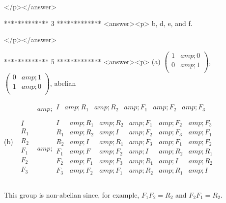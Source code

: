 </p></answer>


*************
3
*************
<answer><p>  b, d, e, and f.

</p></answer>


*************
5
*************
<answer><p> (a)  \(\left(
\begin{array}{cc}
 1 &amp; 0 \\
 0 &amp; 1 \\
\end{array}
\right)\), \(\left(
\begin{array}{cc}
 0 &amp; 1 \\
 1 &amp; 0 \\
\end{array}
\right)\),  abelian



    (b)     \(\begin{array}{c|c}
   &amp; 
\begin{array}{cccccc}
 I &amp; R_1 &amp; R_2 &amp; F_1 &amp; F_2 &amp; F_3 \\
\end{array}
 \\
\hline
 
\begin{array}{c}
 I \\
 R_1 \\
 R_2 \\
 F_1 \\
 F_2 \\
 F_3 \\
\end{array}
 &amp; 
\begin{array}{cccccc}
 I &amp; R_1 &amp; R_2 &amp; F_1 &amp; F_2 &amp; F_3 \\
 R_1 &amp; R_2 &amp; I &amp; F_2 &amp; F_3 &amp; F_1 \\
 R_2 &amp; I &amp; R_1 &amp; F_3 &amp; F_1 &amp; F_2 \\
 F_1 &amp; F &amp; F_2 &amp; I &amp; R_2 &amp; R_1 \\
 F_2 &amp; F_1 &amp; F_3 &amp; R_1 &amp; I &amp; R_2 \\
 F_3 &amp; F_2 &amp; F_1 &amp; R_2 &amp; R_1 &amp; I \\
\end{array}
 \\
\end{array}\)



This group is non-abelian since, for example,  \(F_1F_2=R_2\) and \(F_2F_1=R_2\).



